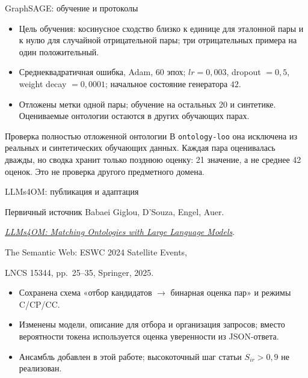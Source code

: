 \documentclass[aspectratio=169,11pt]{beamer}
\begin{document}
\renewcommand{\hseheadertext}{Дополнительные материалы}
\begin{frame}{GraphSAGE: обучение и протоколы}
  \begin{itemize}
    \item Цель обучения: косинусное сходство близко к единице для эталонной пары
      и к нулю для случайной отрицательной пары; три отрицательных примера на один положительный.
    \item Среднеквадратичная ошибка, Adam, 60 эпох;
      $lr=0{,}003$, dropout $=0{,}5$, weight decay $=0{,}0001$;
      начальное состояние генератора $42$.
    \item Отложены метки одной пары; обучение на остальных 20 и синтетике.
      Оцениваемые онтологии остаются в других обучающих парах.
  \end{itemize}
  \begin{alertblock}{Проверка полностью отложенной онтологии}
    В \texttt{ontology-loo} она исключена из реальных и синтетических обучающих данных.
    Каждая пара оценивалась дважды, но сводка хранит только позднюю оценку:
    21 значение, а не среднее 42 оценок. Это не проверка другого предметного домена.
  \end{alertblock}
\end{frame}

\renewcommand{\hseheadertext}{Дополнительные материалы}
\begin{frame}{LLMs4OM: публикация и адаптация}
  \begin{block}{Первичный источник}
    Babaei Giglou, D'Souza, Engel, Auer.\par
    \href{https://doi.org/10.1007/978-3-031-78952-6_3}{\textit{LLMs4OM: Matching Ontologies with Large Language Models}}.\par
    The Semantic Web: ESWC 2024 Satellite Events,\par
    LNCS 15344, pp.~25--35, Springer, 2025.
  \end{block}
  \begin{itemize}
    \item Сохранена схема «отбор кандидатов $\to$ бинарная оценка пар» и режимы C/CP/CC.
    \item Изменены модели, описание для отбора и организация запросов;
      вместо вероятности токена используется оценка уверенности из JSON-ответа.
    \item Ансамбль добавлен в этой работе; высокоточный шаг статьи $S_{ir}>0{,}9$ не реализован.
  \end{itemize}
\end{frame}
\end{document}
